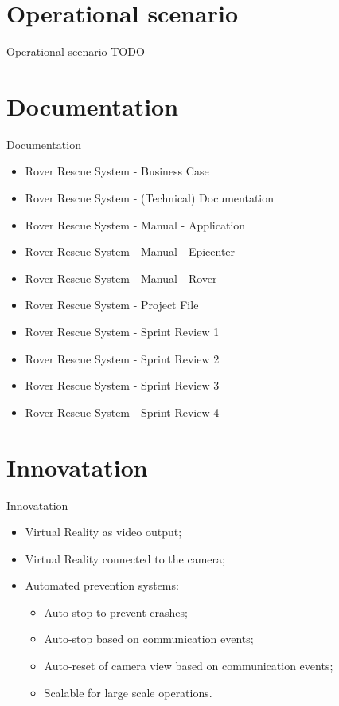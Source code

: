 \documentclass{beamer}
\begin{document}
\section{Operational scenario}
\begin{frame}{Operational scenario}
TODO
\end{frame}

\section{Documentation}
\begin{frame}{Documentation}
	\begin{itemize}
		\item Rover Rescue System - Business Case
		\item Rover Rescue System - (Technical) Documentation
		\item Rover Rescue System - Manual - Application
		\item Rover Rescue System - Manual - Epicenter
		\item Rover Rescue System - Manual - Rover
		\item Rover Rescue System - Project File
	 	\item Rover Rescue System - Sprint Review 1
	 	\item Rover Rescue System - Sprint Review 2
	 	\item Rover Rescue System - Sprint Review 3
	 	\item Rover Rescue System - Sprint Review 4
	\end{itemize}
\end{frame}

\section{Innovatation}
\begin{frame}{Innovatation}
	\begin{itemize}
		\item Virtual Reality as video output;
		\item Virtual Reality connected to the camera;
		\item Automated prevention systems:
		\begin{itemize}
			\item Auto-stop to prevent crashes;
			\item Auto-stop based on communication events;
			\item Auto-reset of camera view based on communication events;
			\item Scalable for large scale operations.
		\end{itemize}
	\end{itemize}
\end{frame}
\end{document}
